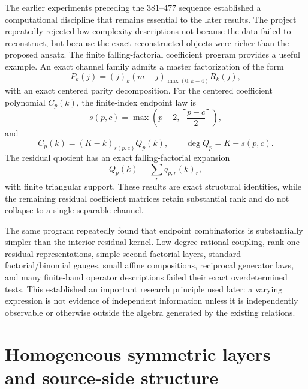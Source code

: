 \documentclass[11pt,a4paper]{article}
\newcommand{\fall}[2]{(#1)_{#2}}
\begin{document}
The earlier experiments preceding the $381$--$477$ sequence established a computational discipline that remains essential to the later results. The project repeatedly rejected low-complexity descriptions not because the data failed to reconstruct, but because the exact reconstructed objects were richer than the proposed ansatz. The finite falling-factorial coefficient program provides a useful example. An exact channel family admits a master factorization of the form
\begin{equation}
P_k(j)=\fall{j}{k}\fall{m-j}{\max(0,k-4)}R_k(j),
\end{equation}
with an exact centered parity decomposition. For the centered coefficient polynomial $C_p(k)$, the finite-index endpoint law is
\begin{equation}
s(p,c)=\max\!\left(p-2,\left\lceil\frac{p-c}{2}\right\rceil\right),
\end{equation}
and
\begin{equation}
C_p(k)=\fall{K-k}{s(p,c)}Q_p(k),
\qquad
\deg Q_p=K-s(p,c).
\end{equation}
The residual quotient has an exact falling-factorial expansion
\begin{equation}
Q_p(k)=\sum_r q_{p,r}\fall{k}{r},
\end{equation}
with finite triangular support. These results are exact structural identities, while the remaining residual coefficient matrices retain substantial rank and do not collapse to a single separable channel.

The same program repeatedly found that endpoint combinatorics is substantially simpler than the interior residual kernel. Low-degree rational coupling, rank-one residual representations, simple second factorial layers, standard factorial/binomial gauges, small affine compositions, reciprocal generator laws, and many finite-band operator descriptions failed their exact overdetermined tests. This established an important research principle used later: a varying expression is not evidence of independent information unless it is independently observable or otherwise outside the algebra generated by the existing relations.

\section{Homogeneous symmetric layers and source-side structure}
\end{document}
